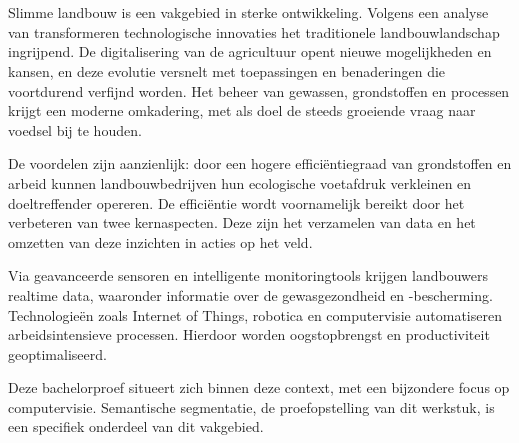 \chapter{}%
\label{ch:stand-van-zaken}





Slimme landbouw is een vakgebied in sterke ontwikkeling. Volgens een analyse van \textcite{Karunathilake2023} transformeren technologische innovaties het traditionele landbouwlandschap ingrijpend. De digitalisering van de agricultuur opent nieuwe mogelijkheden en kansen, en deze evolutie versnelt met toepassingen en benaderingen die voortdurend verfijnd worden. Het beheer van gewassen, grondstoffen en processen krijgt een moderne omkadering, met als doel de steeds groeiende vraag naar voedsel bij te houden.

De voordelen zijn aanzienlijk: door een hogere efficiëntiegraad van grondstoffen en arbeid kunnen landbouwbedrijven hun ecologische voetafdruk verkleinen en doeltreffender opereren. De efficiëntie wordt voornamelijk bereikt door het verbeteren van twee kernaspecten. Deze zijn het verzamelen van data en het omzetten van deze inzichten in acties op het veld.

Via geavanceerde sensoren en intelligente monitoringtools krijgen landbouwers realtime data, waaronder informatie over de gewasgezondheid en -bescherming. Technologieën zoals Internet of Things, robotica en computervisie automatiseren arbeidsintensieve processen. Hierdoor worden oogstopbrengst en productiviteit geoptimaliseerd.

Deze bachelorproef situeert zich binnen deze context, met een bijzondere focus op computervisie. Semantische segmentatie, de proefopstelling van dit werkstuk, is een specifiek onderdeel van dit vakgebied.

